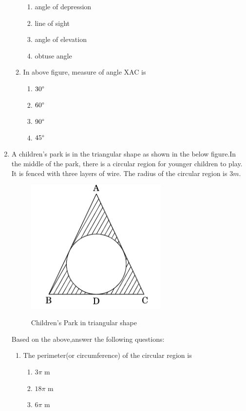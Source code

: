 \documentclass[11pt]{article}
\begin{document}
\begin{enumerate}
\begin{enumerate}[label=(\roman*)]
				\begin{enumerate}[label=(\Alph*)]
					\item angle of depression
					\item line of sight
					\item angle of elevation
					\item obtuse angle
				\end{enumerate}
			\item In above figure, measure of angle XAC is
				\begin{enumerate}[label=(\Alph*)]
					\item $30\degree$
					\item $60\degree$
					\item $90\degree$
					\item $45\degree$
				\end{enumerate}
		\end{enumerate}
	\item A children's park is in the triangular shape as shown in the below figure.In the middle of the park, there is a circular region for younger children to play. It is fenced with three layers of wire. The radius of the circular region is $3 m$.
		\begin{figure}[ht!]
		\centering
		\includegraphics[width=200pt]{Figs/Park.png}
		\label{fig:Park}
		\caption{Children's Park in triangular shape}
		\end{figure}
		Based on the above,answer the following questions:
		\begin{enumerate}[label=(\roman*)]
			\item The perimeter(or circumference) of the circular region is
				\begin{enumerate}[label=(\Alph*)]
					\item $3\pi$ m
					\item ${18}\pi$ m
					\item $6\pi$ m

\end{enumerate}
\end{enumerate}
\end{enumerate}
\end{document}
